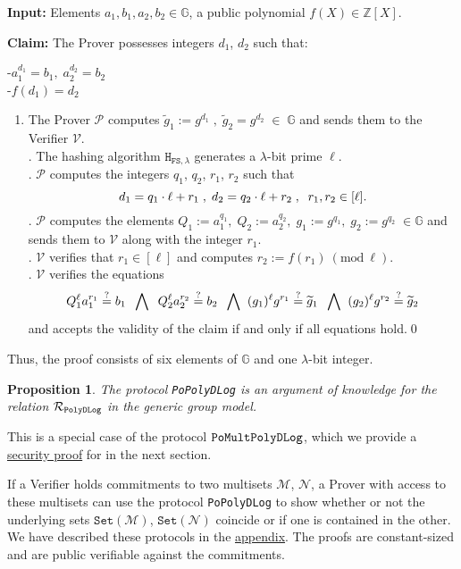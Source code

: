 \documentclass[11pt, lettersize, notitlepage, leqno, footskip=0.6cm]{article}
\newcommand{\bz}{\mathbb Z}
\newcommand{\ttt}{\texttt}
\newcommand{\bG}{\mathbb{G}}
\newcommand{\sett}{\ttt{Set}}
\newcommand{\wti}{\widetilde}
\newcommand{\mc}{\mathcal}
\newcommand{\mb}{\mathbb}
\newcommand{\lam}{\lambda}
\newcommand{\lamb}{\lambda}
\newcommand{\V}{\mc{V}}
\newcommand{\mcM}{\mc{M}}
\newcommand{\vs}{\vspace{-0.15cm}}
\newcommand{\noin}{\noindent}
\newcommand{\Mod}[1]{\ (\mathrm{mod}\ #1)}
\newtheorem{Prop}[Thm]{Proposition}
\numberwithin{equation}{section}
\begin{document}
\noin \textbf{Input:} Elements $a_1, b_1, a_2, b_2\in \mb{G}$, a public polynomial $f(X)\in\bz[X]$.

\noin \textbf{Claim:} The Prover possesses integers $d_1$, $d_2$ such that:

\noin -$a_1^{d_1} = b_1,\;  a_2^{d_2} = b_2$\\
-$f(d_1) = d_2$

\begin{enumerate}[wide, labelwidth=!, labelindent=0pt]\vs \item The Prover $\mc{P}$ computes $\wti{g}_1:= g^{d_1}\;,\; \wti{g}_2 = g^{d_2}\;\in\;\bG$ and sends them to the Verifier $\mc{V}$.\\
\noin 2. The hashing algorithm $\ttt{H}_{\ttt{FS},\lam}$ generates a $\lamb$-bit prime $\ell$.\\
\noin 3. $\mc{P}$ computes the integers $q_1$, $q_2$, $r_1$, $r_2$ such that \vs $$d_1 = q_1\cdot\ell+r_1\;,\; d_2 = q_2\cdot\ell+r_2\;,\;\; r_1,r_2\in [\ell]. \vs $$
\noin 4. $\mc{P}$ computes the elements $Q_1:= a_1^{q_1},\;Q_2:= a_2^{q_2},\; g_1:= g^{q_1},\; g_2:= g^{q_2}\;\in\mb{G}$ and sends them to $\mc{V}$ along with the integer $r_1$.\\
\noin 5. $\V$ verifies that $r_1\in [\ell]$ and computes $r_2:= f(r_1)\Mod{\ell}$.\\
\noin 6. $\mc{V}$ verifies the equations \vs $$Q_1^{\ell}a_1^{r_1}\stackrel{?}{=} b_1\;\;\bigwedge\;\; Q_2^{\ell}a_2^{r_2}\stackrel{?}{=} b_2 \;\;\bigwedge\;\; (g_1)^{\ell}g^{r_1} \stackrel{?}{=} \wti{g}_1\;\;\bigwedge\;\; (g_2)^{\ell}g^{r_2} \stackrel{?}{=} \wti{g}_2 \vs $$ and accepts the validity of the claim if and only if all equations hold.\qed \end{enumerate}

\noin Thus, the proof consists of six elements of $\mb{G}$ and one $\lam$-bit integer.

\begin{Prop} The protocol \verb|PoPolyDLog| is an argument of knowledge for the relation $\mc{R}_{\tt{PolyDLog}}$ in the generic group
model.\end{Prop}

\begin{prf} This is a special case of the protocol \hyperlink{Mult}{$\tt{PoMultPolyDLog}$}, which we provide a \hyperlink{Generalized}{security proof} for in the next section.\end{prf}

If a Verifier holds commitments to two multisets $\mcM$, $\mc{N}$, a Prover with access to these multisets can use the protocol \verb|PoPolyDLog| to show whether or not the underlying sets $\sett{(\mcM)}$, $\sett{(\mc{N})}$ coincide or if one is contained in the other. We have described these protocols in the \hyperlink{Sets}{appendix}. The proofs are constant-sized and are public verifiable against the commitments.
\end{document}
